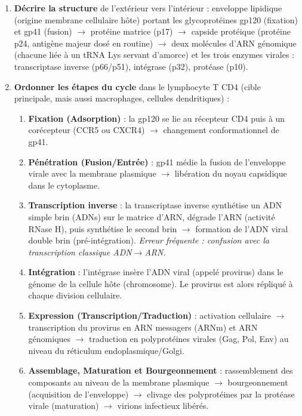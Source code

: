\documentclass[11pt]{article}
\newcommand{\cle}[1]{{\popxbold\color{popdark}#1}}
\begin{document}
\begin{methode}
\begin{enumerate}
\item \textbf{Décrire la structure} de l'extérieur vers l'intérieur : \cle{enveloppe} lipidique (origine membrane cellulaire hôte) portant les glycoprotéines \cle{gp120} (fixation) et \cle{gp41} (fusion) $\rightarrow$ protéine \cle{matrice (p17)} $\rightarrow$ \cle{capside} protéique (protéine \cle{p24}, antigène majeur dosé en routine) $\rightarrow$ deux molécules d'\cle{ARN} génomique (chacune liée à un \cle{tRNA Lys} servant d'amorce) et les trois enzymes virales : \cle{transcriptase inverse} (p66/p51), \cle{intégrase} (p32), \cle{protéase} (p10).
\item \textbf{Ordonner les étapes du cycle} dans le lymphocyte T CD4 (cible principale, mais aussi macrophages, cellules dendritiques) :
\begin{enumerate}
\item \textbf{Fixation (Adsorption)} : la \cle{gp120} se lie au récepteur \cle{CD4} puis à un \cle{corécepteur} (CCR5 ou CXCR4) $\rightarrow$ changement conformationnel de gp41.
\item \textbf{Pénétration (Fusion/Entrée)} : \cle{gp41} médie la fusion de l'enveloppe virale avec la membrane plasmique $\rightarrow$ libération du noyau capsidique dans le cytoplasme.
\item \textbf{Transcription inverse} : la \cle{transcriptase inverse} synthétise un ADN simple brin (ADNs) sur le matrice d'ARN, dégrade l'ARN (activité RNase H), puis synthétise le second brin $\rightarrow$ formation de l'\cle{ADN viral double brin} (pré-intégration). \emph{Erreur fréquente : confusion avec la transcription classique ADN$\rightarrow$ARN.}
\item \textbf{Intégration} : l'\cle{intégrase} insère l'ADN viral (appelé \cle{provirus}) dans le génome de la cellule hôte (chromosome). Le provirus est alors répliqué à chaque division cellulaire.
\item \textbf{Expression (Transcription/Traduction)} : activation cellulaire $\rightarrow$ transcription du provirus en ARN messagers (ARNm) et ARN génomiques $\rightarrow$ traduction en polyprotéines virales (Gag, Pol, Env) au niveau du réticulum endoplasmique/Golgi.
\item \textbf{Assemblage, Maturation et Bourgeonnement} : rassemblement des composants au niveau de la membrane plasmique $\rightarrow$ bourgeonnement (acquisition de l'enveloppe) $\rightarrow$ clivage des polyprotéines par la \cle{protéase virale} (maturation) $\rightarrow$ virions infectieux libérés.

\end{enumerate}
\end{enumerate}
\end{methode}
\end{document}
